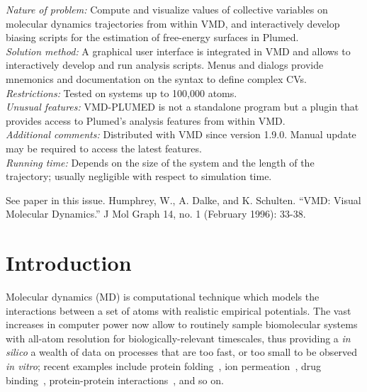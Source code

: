 \documentclass[preprint,12pt]{elsarticle}
\begin{document}
\begin{small}
  {\em Nature of problem:} Compute and visualize values of collective
  variables on molecular dynamics trajectories from within VMD, and
  interactively develop biasing scripts for the estimation of
  free-energy surfaces in Plumed.
  \\
  {\em Solution method:} A graphical user interface is integrated in
  VMD and allows to interactively develop and run analysis scripts.
  Menus and dialogs provide mnemonics and documentation on the syntax
  to define complex CVs.
  \\
  {\em Restrictions:}
  Tested on systems up to 100,000 atoms. \\
  {\em Unusual features:} VMD-PLUMED is not a standalone program but a
  plugin that provides access to Plumed's analysis features from within VMD. \\
  {\em Additional comments:} Distributed with VMD since version 1.9.0.
  Manual  update may be required  to access the latest features.   \\
  {\em Running time:} Depends on the size of the system and the length
  of the trajectory; usually negligible with respect to simulation time.  \\
\begin{thebibliography}{0}
See paper in this issue.
Humphrey, W., A. Dalke, and K. Schulten. ``VMD: Visual Molecular Dynamics.'' J Mol Graph 14, no. 1 (February 1996): 33-38. 
\end{thebibliography}

\end{small}



\section{Introduction}

Molecular dynamics (MD) is computational technique which models the
interactions between a set of atoms with realistic empirical
potentials. The vast increases in computer power now allow to
routinely sample biomolecular systems with all-atom resolution for
biologically-relevant timescales, thus providing a \emph{in silico} a
wealth of data on processes that are too fast, or too small to be
observed \emph{in vitro}; recent examples include protein
folding~\cite{Lindorff-Larsen_Piana_Dror_Shaw_2011}, ion permeation~\cite{Jensen_Jogini_Borhani_Leffler_Dror_Shaw_2012},
drug binding~\cite{Shan_Kim_Eastwood_Dror_Seeliger_Shaw_2011,Buch_Giorgino_2011}, protein-protein interactions~\cite{Ahmad_Gu_Helms_2008,Giorgino_Buch_2012}, and so on.
\end{document}
